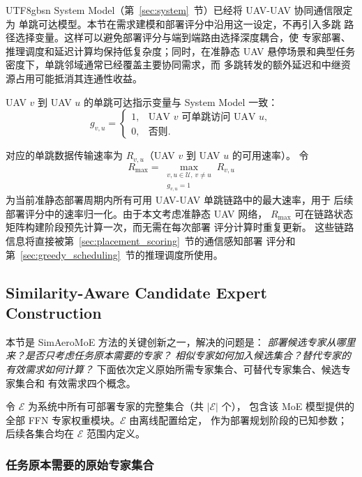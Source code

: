 \documentclass[conference]{IEEEtran}
\begin{document}
\begin{CJK*}{UTF8}{gbsn}
System Model（第~\ref{sec:system}~节）已经将 UAV-UAV 协同通信限定为
单跳可达模型。本节在需求建模和部署评分中沿用这一设定，不再引入多跳
路径选择变量。这样可以避免部署评分与端到端路由选择深度耦合，使
专家部署、推理调度和延迟计算均保持低复杂度；同时，在准静态 UAV
悬停场景和典型任务密度下，单跳邻域通常已经覆盖主要协同需求，而
多跳转发的额外延迟和中继资源占用可能抵消其连通性收益。

UAV $v$ 到 UAV $u$ 的单跳可达指示变量与 System Model 一致：
\begin{equation}
g_{v,u} =
\begin{cases}
1, & \text{UAV } v \text{ 可单跳访问 UAV } u,\\
0, & \text{否则}.
\end{cases}
\label{eq:single_hop_g}
\end{equation}

对应的单跳数据传输速率为 $R_{v,u}$（UAV $v$ 到 UAV $u$ 的可用速率）。
令
\begin{equation}
R_{\max} =
\max_{\substack{v,u\in\mathcal{U},\,v\neq u\\ g_{v,u}=1}} R_{v,u}
\end{equation}
为当前准静态部署周期内所有可用 UAV-UAV 单跳链路中的最大速率，用于
后续部署评分中的速率归一化。由于本文考虑准静态 UAV 网络，
$R_{\max}$ 可在链路状态矩阵构建阶段预先计算一次，而无需在每次部署
评分计算时重复更新。
这些链路信息将直接被第~\ref{sec:placement_scoring}~节的通信感知部署
评分和第~\ref{sec:greedy_scheduling}~节的推理调度所使用。

\subsection{Similarity-Aware Candidate Expert Construction}
\label{sec:similarity_candidate}

本节是 SimAeroMoE 方法的关键创新之一，解决的问题是：
\emph{部署候选专家从哪里来？是否只考虑任务原本需要的专家？
相似专家如何加入候选集合？替代专家的有效需求如何计算？}
下面依次定义原始所需专家集合、可替代专家集合、候选专家集合和
有效需求四个概念。

令 $\mathcal{E}$ 为系统中所有可部署专家的完整集合（共 $|\mathcal{E}|$ 个），
包含该 MoE 模型提供的全部 FFN 专家权重模块。$\mathcal{E}$ 由离线配置给定，
作为部署规划阶段的已知参数；后续各集合均在 $\mathcal{E}$ 范围内定义。

\subsubsection{任务原本需要的原始专家集合}


\end{CJK*}
\end{document}
